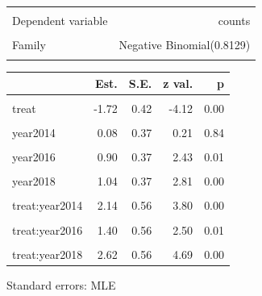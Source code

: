 \documentclass[
]{article}
\begin{document}
\begin{table}[!h]
\centering
\begin{tabular}{lr}
\toprule
\cellcolor{gray!10}{Observations} & \cellcolor{gray!10}{252}\\
Dependent variable & counts\\
\cellcolor{gray!10}{Type} & \cellcolor{gray!10}{Generalized linear model}\\
Family & Negative Binomial(0.8129)\\
\cellcolor{gray!10}{Link} & \cellcolor{gray!10}{log}\\
\bottomrule
\end{tabular}
\end{table}  \begin{table}[!h]
\centering
\begin{threeparttable}
\begin{tabular}{lrrrr}
\toprule
  & Est. & S.E. & z val. & p\\
\midrule
\cellcolor{gray!10}{(Intercept)} & \cellcolor{gray!10}{2.35} & \cellcolor{gray!10}{0.26} & \cellcolor{gray!10}{8.89} & \cellcolor{gray!10}{0.00}\\
treat & -1.72 & 0.42 & -4.12 & 0.00\\
\cellcolor{gray!10}{year2013} & \cellcolor{gray!10}{-0.35} & \cellcolor{gray!10}{0.38} & \cellcolor{gray!10}{-0.93} & \cellcolor{gray!10}{0.35}\\
year2014 & 0.08 & 0.37 & 0.21 & 0.84\\
\cellcolor{gray!10}{year2015} & \cellcolor{gray!10}{0.86} & \cellcolor{gray!10}{0.37} & \cellcolor{gray!10}{2.32} & \cellcolor{gray!10}{0.02}\\
\addlinespace
year2016 & 0.90 & 0.37 & 2.43 & 0.01\\
\cellcolor{gray!10}{year2017} & \cellcolor{gray!10}{1.56} & \cellcolor{gray!10}{0.37} & \cellcolor{gray!10}{4.25} & \cellcolor{gray!10}{0.00}\\
year2018 & 1.04 & 0.37 & 2.81 & 0.00\\
\cellcolor{gray!10}{treat:year2013} & \cellcolor{gray!10}{1.52} & \cellcolor{gray!10}{0.57} & \cellcolor{gray!10}{2.66} & \cellcolor{gray!10}{0.01}\\
treat:year2014 & 2.14 & 0.56 & 3.80 & 0.00\\
\addlinespace
\cellcolor{gray!10}{treat:year2015} & \cellcolor{gray!10}{2.12} & \cellcolor{gray!10}{0.56} & \cellcolor{gray!10}{3.79} & \cellcolor{gray!10}{0.00}\\
treat:year2016 & 1.40 & 0.56 & 2.50 & 0.01\\
\cellcolor{gray!10}{treat:year2017} & \cellcolor{gray!10}{1.55} & \cellcolor{gray!10}{0.56} & \cellcolor{gray!10}{2.77} & \cellcolor{gray!10}{0.01}\\
treat:year2018 & 2.62 & 0.56 & 4.69 & 0.00\\
\bottomrule
\end{tabular}
\begin{tablenotes}
\item Standard errors: MLE
\end{tablenotes}
\end{threeparttable}
\end{table}
\end{document}
